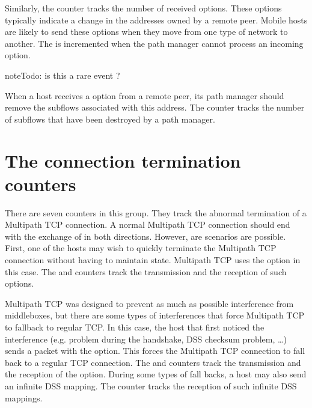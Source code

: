 \documentclass[letterpaper,10pt,english]{sphinxmanual}
\begin{document}
\sphinxAtStartPar
Similarly, the  counter tracks the number of received
 options. These options typically indicate a change in the
addresses owned by a remote peer. Mobile hosts are likely to send these
options when they move from one type of network to another. The
 is incremented when the path manager cannot process an
incoming  option.

\begin{sphinxadmonition}{note}{\label{\detokenize{nstat-mptcp:id4}}Todo:}
\sphinxAtStartPar
is this a rare event ?
\end{sphinxadmonition}

\sphinxAtStartPar
When a host receives a  option from a remote peer, its path
manager should remove the subflows associated with this address. The
 counter tracks the number of subflows that have
been destroyed by a path manager.


\section{The connection termination counters}
\label{\detokenize{nstat-mptcp:the-connection-termination-counters}}
\sphinxAtStartPar
There are seven counters in this group. They track the abnormal termination of
a Multipath TCP connection. A normal Multipath TCP connection should end
with the exchange of  in both directions. However, are scenarios
are possible. First, one of the hosts may wish to quickly terminate the
Multipath TCP connection without having to maintain state. Multipath TCP
uses the  option
in this case. The  and 
counters track the transmission and the reception of such options.

\sphinxAtStartPar
Multipath TCP was designed to prevent as much as possible interference
from middleboxes, but there are some types of interferences that force
Multipath TCP to fallback to regular TCP. In this case, the host that first
noticed the interference (e.g. problem during the handshake, DSS checksum
problem, …) sends a packet with the  option. This forces the
Multipath TCP connection to fall back to a regular TCP connection.
The  and  counters track the
transmission and the reception of the  option. During some
types of fall backs, a host may also send an infinite DSS mapping. The
 counter tracks the reception of such infinite
DSS mappings.
\end{document}
